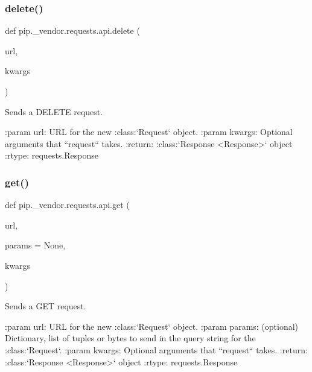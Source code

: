 \subsubsection{\texorpdfstring{delete()}{delete()}}
{\footnotesize\ttfamily def pip.\+\_\+vendor.\+requests.\+api.\+delete (\begin{DoxyParamCaption}\item[{}]{url,  }\item[{}]{kwargs }\end{DoxyParamCaption})}

\begin{DoxyVerb}Sends a DELETE request.

:param url: URL for the new :class:`Request` object.
:param \*\*kwargs: Optional arguments that ``request`` takes.
:return: :class:`Response <Response>` object
:rtype: requests.Response
\end{DoxyVerb}
 \mbox{\label{namespacepip_1_1__vendor_1_1requests_1_1api_aaa016377aa5f06966ba79856f8335448}} 
\subsubsection{\texorpdfstring{get()}{get()}}
{\footnotesize\ttfamily def pip.\+\_\+vendor.\+requests.\+api.\+get (\begin{DoxyParamCaption}\item[{}]{url,  }\item[{}]{params = {\ttfamily None},  }\item[{}]{kwargs }\end{DoxyParamCaption})}

\begin{DoxyVerb}Sends a GET request.

:param url: URL for the new :class:`Request` object.
:param params: (optional) Dictionary, list of tuples or bytes to send
    in the query string for the :class:`Request`.
:param \*\*kwargs: Optional arguments that ``request`` takes.
:return: :class:`Response <Response>` object
:rtype: requests.Response
\end{DoxyVerb}
 \mbox{\label{namespacepip_1_1__vendor_1_1requests_1_1api_ac1ce0a9e379ea4d408a70dbef26636d7}} 
